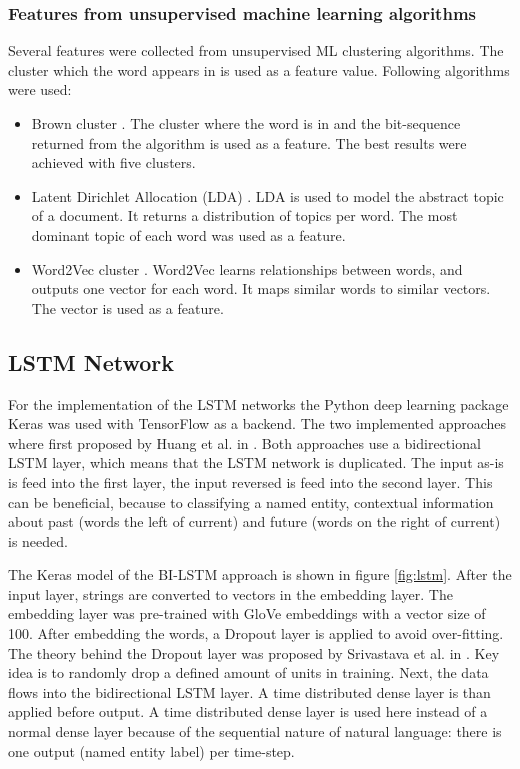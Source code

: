 \documentclass[12pt]{book}
\begin{document}
	\subsubsection{Features from unsupervised machine learning algorithms}
	Several features were collected from unsupervised ML clustering algorithms. The cluster which the word appears in is used as a feature value.
	Following algorithms were used:
	\begin{itemize}
		\item Brown cluster \cite{brown1992class}. The cluster where the word is in and the bit-sequence returned from the algorithm is used as a feature. The best results were achieved with five clusters.
		\item Latent Dirichlet Allocation (LDA) \cite{blei2003latent}. LDA is used to model the abstract topic of a document. It returns a distribution of topics per word. The most dominant topic of each word was used as a feature.
		\item Word2Vec cluster \cite{w2vgensim}. Word2Vec learns relationships between words, and outputs one vector for each word. It maps similar words to similar vectors. The vector is used as a feature.
	\end{itemize}
	
	\subsection{LSTM Network}
	\label{sub:lstm}
	
	For the implementation of the LSTM networks the Python deep learning package Keras \cite{keras} was used with TensorFlow \cite{tensorflow} as a backend. The two implemented approaches where first proposed by Huang et al. in \cite{huang2015bidirectional}. Both approaches use a bidirectional LSTM layer, which means that the LSTM network is duplicated. The input as-is is feed into the first layer, the input reversed is feed into the second layer. This can be beneficial, because to classifying a named entity, contextual information about past (words the left of current) and future (words on the right of current) is needed.
	
	The Keras model of the BI-LSTM approach is shown in figure \ref{fig:lstm}. After the input layer, strings are converted to vectors in the embedding layer. The embedding layer was pre-trained with GloVe \cite{glove} embeddings with a vector size of 100. After embedding the words, a Dropout layer is applied to avoid over-fitting. The theory behind the Dropout layer was proposed by Srivastava et al. in \cite{srivastava2014dropout}. Key idea is to randomly drop a defined amount of units in training. Next, the data flows into the bidirectional LSTM layer. A time distributed dense layer is than applied before output. A time distributed dense layer is used here instead of a normal dense layer because of the sequential nature of natural language: there is one output (named entity label) per time-step.
\end{document}
